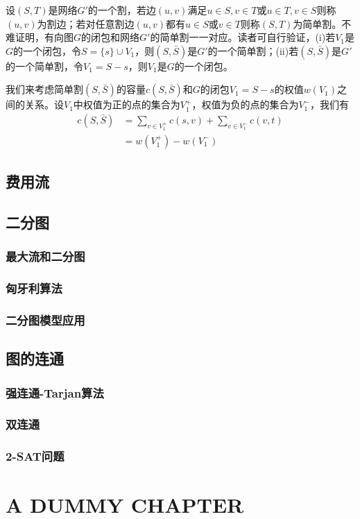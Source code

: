 \documentclass[a4paper]{ctexbook}
\begin{document}
  设$(S,T)$是网络$G'$的一个割，若边$(u,v)$满足$u\in S,v\in T$或$u\in T, v\in S$则称$(u,v)$为割边；若对任意割边$(u,v)$都有$u\in S$或$v\in T$则称$(S,T)$为简单割。不难证明，有向图$G$的闭包和网络$G'$的简单割一一对应。读者可自行验证，(i)若$V_1$是$G$的一个闭包，令$S=\{s\}\cup V_1$，则$(S,\bar{S})$是$G'$的一个简单割；(ii)若$(S,\bar{S})$是$G'$的一个简单割，令$V_1=S-s$，则$V_1$是$G$的一个闭包。

  我们来考虑简单割$(S,\bar{S})$的容量$c(S,\bar{S})$和$G$的闭包$V_1=S-s$的权值$w(V_1)$之间的关系。设$V_1$中权值为正的点的集合为$V_1^+$，权值为负的点的集合为$V_1^-$，我们有
  \begin{align*}
    c(S,\bar{S}) &=\sum_{v\in V_1^+}c(s,v) +\sum_{v\in V_1^-}c(v,t)\\  
    &=w(V_1^+)-w(V_1^-)
  \end{align*}
  \section{费用流}
  \section{二分图}
  \subsection{最大流和二分图}
  \subsection{匈牙利算法}
  \subsection{二分图模型应用}
  \section{图的连通}
  \subsection{强连通-Tarjan算法}
  \subsection{双连通}
  \subsection{2-SAT问题}
  \chapter{A DUMMY CHAPTER}
\end{document}
